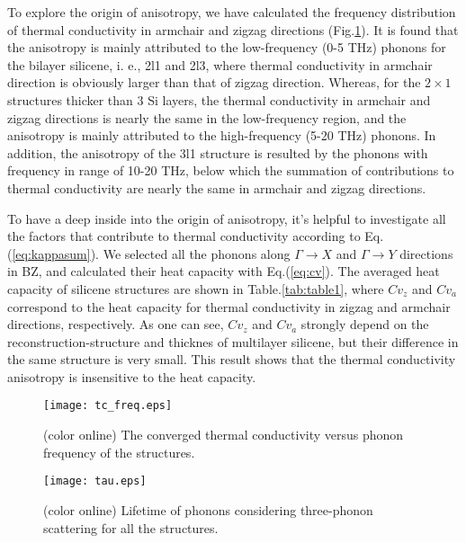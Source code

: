 \documentclass[aps,prb,twocolumn,showpacs,amsmath,amssymb]{revtex4-1}
\begin{document}
To explore the origin of anisotropy, we have calculated the frequency distribution of thermal conductivity in armchair and zigzag directions  (Fig.\ref{fig:tc_freq}).
It is found that the  anisotropy is mainly attributed to the low-frequency (0-5 THz) phonons for the bilayer silicene, i. e., 2l1 and 2l3, where thermal conductivity in armchair direction is obviously larger than that of zigzag direction.
Whereas, for the $2\times1$ structures thicker than 3 Si layers, the thermal conductivity in armchair and zigzag directions is nearly the same in the low-frequency region, and the anisotropy is mainly  attributed to the high-frequency (5-20 THz) phonons. 
In addition, the anisotropy of the 3l1 structure is resulted by the  phonons with frequency in range of 10-20 THz, below which the summation of contributions to thermal conductivity are nearly the same in armchair and zigzag directions. 

To have a deep inside into the origin of anisotropy, it's helpful to investigate all the factors that contribute to thermal conductivity according to Eq.(\ref{eq:kappasum}).
We selected all the phonons along  $\Gamma\rightarrow X$ and $\Gamma \rightarrow Y$ directions in BZ, and calculated their heat capacity with Eq.(\ref{eq:cv}). The averaged heat capacity of silicene structures are shown in Table.\ref{tab:table1}, where $Cv_z$ and $Cv_a$ correspond to the  heat capacity for thermal conductivity in  zigzag and armchair directions, respectively.  As one can see, $Cv_z$ and $Cv_a$  strongly depend on the reconstruction-structure and thicknes of multilayer silicene, but their difference in the same structure is very small. This result shows that the thermal conductivity anisotropy is insensitive to the heat capacity. 

\begin{figure}[b]
  \texttt{[image: tc\_freq.eps]}
  \caption{\label{fig:tc_freq} (color online)  The converged thermal conductivity versus phonon frequency of the structures. }
\end{figure}

\begin{figure}[b]
  \texttt{[image: tau.eps]}
  \caption{\label{fig:tau} (color online) Lifetime of phonons considering three-phonon scattering for all the structures. }
\end{figure}
\end{document}

